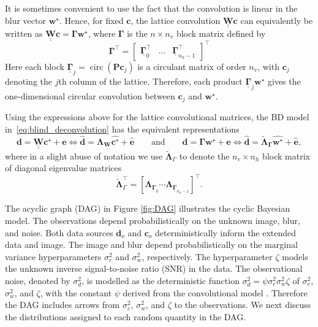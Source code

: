 \documentclass[12pt]{article}
\newcommand{\mycirc}[1] {\underline{\bm{#1}}}
\newcommand{\mybcirc}[1] {\underline{\underline{\bm{#1}}}}
\begin{document}
It is sometimes convenient to use the fact that the convolution is linear in
the blur vector $\bm w^{\star}$. Hence, for fixed $\bm c$, the lattice
convolution $\mybcirc{W}\bm c$ can equivalently be written as $\mybcirc{W}\bm c = \bm{\Gamma}\bm w^{\star}$,
where $\bm{\Gamma}$ is the $n \times n_v$ block matrix defined by
\begin{equation} \label{eq:gamma}
    \bm{\Gamma}^{\top} = \left[ \begin{array}{ccc}
\mycirc{\Gamma}_0^{\top} & \ldots & \mycirc{\Gamma}_{n_h-1}^{\top}
\end{array}\right]^{\top}
\end{equation}
Here each block $\mycirc{\Gamma}_j = \operatorname{circ}(\bm P\bm c_j)$
is a circulant matrix of order $n_v$, with $\bm c_j$ denoting the $j$th
column of the lattice. Therefore, each product
$\mycirc{\Gamma}_j\bm w^{\star}$ gives the one-dimensional circular
convolution between $\bm c_j$ and $\bm w^{\star}$. 

Using the expressions above for the lattice convolutional matrices, the BD model in~\eqref{eq:blind_deconvolution} has the equivalent representations 
\begin{equation}
    \bm{d} = \mybcirc{W}\bm{c}^{\star} + \bm{e} 
    \iff 
    \hat{\bm{d}} = \bm{\Lambda}_{\mybcirc{W}} \hat{\bm{c}^{\star}} + \hat{\bm{e}} 
    \qquad \mbox{and} \qquad
    \bm{d} = \bm{\Gamma} \bm{w}^{\star} + \bm{e} 
    \iff 
    \hat{\bm{d}} = \tilde{\bm{\Lambda}}_{\bm{\Gamma}} \hat{\bm{w}^{\star}}+\hat{\bm{e}},
\end{equation}
where in a slight abuse of notation we use $\tilde{\bm{\Lambda}}_{\Gamma}$ to denote the $n_v \times n_h$ block matrix of diagonal eigenvalue matrices
\begin{equation}
    \tilde{\bm{\Lambda}}_{\Gamma}^{\top} = [\bm{\Lambda}_{\mycirc{\Gamma}_{0}} \cdots \bm{\Lambda}_{\mycirc{\Gamma}_{n_{h}-1}} ]^{\top}.
\end{equation}

The acyclic graph (DAG) in Figure \ref{fig:DAG} illustrates the cyclic Bayesian model.
The observations depend probabilistically on the unknown image,  blur, and noise.
Both data sources $\bm{d}_o$ and $\bm{c}_o$ deterministically inform the extended data and image. 
The image and blur depend probabilistically on the marginal variance hyperparameters $\sigma_c^2$ and $\sigma_w^2$, respectively. The hyperparameter $\zeta$ models the unknown inverse signal-to-noise ratio (SNR) in the data. The observational noise, denoted by $\sigma_d^2$, is modelled as the deterministic function $\sigma_d^2 = \psi \sigma_c^2 \sigma_w^2 \zeta$ of $\sigma_c^2$, $\sigma_w^2$, and $\zeta$, with the constant $\psi$ derived from the convolutional model \citep{Senn2025}. Therefore the DAG includes arrows from $\sigma_c^2$, $\sigma_w^2$, and $\zeta$ to the observations. 
We next discuss the distributions assigned to each random quantity in the DAG. 
\end{document}
